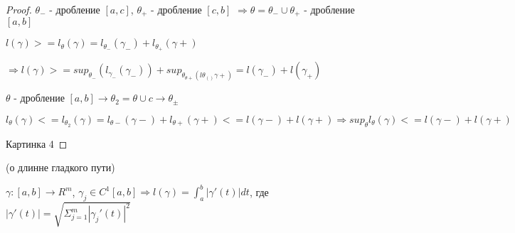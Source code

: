 \begin{proof}
    $\theta_-$ - дробление $[a, c]$, $\theta_+$ - дробление $[c, b]$
     $\Rightarrow \theta = \theta_- \cup \theta_+$ - дробление $[a, b]$

    $l(\gamma) >= l_\theta(\gamma) = l_{\theta_-}(\gamma_-) + l_{\theta_+}(\gamma+)$

$\Rightarrow l(\gamma) >= sup_{\theta_-}(l_{\gamma_-}(\gamma_-)) + sup_{\theta_{\theta+}(l\theta_()\gamma+)} = l(\gamma_-) + l(\gamma_+)$

$\theta $ - дробление $[a, b] \to \theta_2 = \theta \cup {c} \to \theta_{\pm}$

$l_\theta(\gamma) <= l_{\theta_2}(\gamma) = l_{\theta-}(\gamma-) + l_{\theta+}(\gamma+) <= l(\gamma-) + l(\gamma+) \Rightarrow sup_\theta{l_{\theta}(\gamma)} <= l(\gamma-) + l(\gamma+)$

Картинка 4
\end{proof}

\begin{theorem}
    (о длинне гладкого пути)

    $\gamma : [a, b] \to R^m$, $\gamma_j\in C^1[a, b] \Rightarrow l(\gamma) = \int_a^b |\gamma'(t)| dt$, где
    $|\gamma'(t)| = \sqrt{\Sigma_{j = 1}^m |\gamma_j'(t)|^2}$
\end{theorem}


